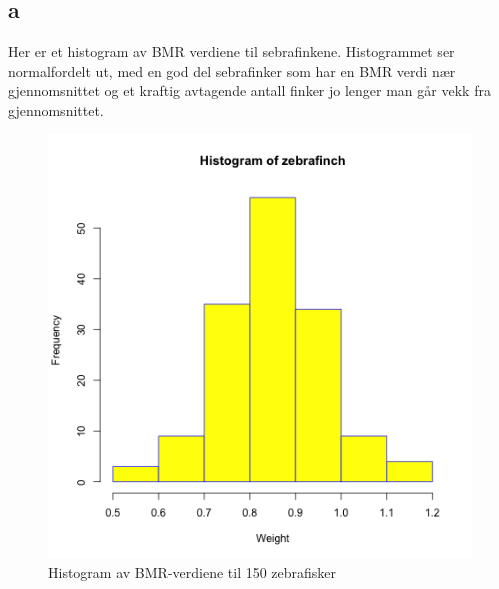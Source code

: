 

\maketitle
\newpage



\section{}%

\subsection*{a}
Her er et histogram av BMR verdiene til sebrafinkene. Histogrammet ser normalfordelt ut, med en god del sebrafinker som har en BMR verdi nær gjennomsnittet og et kraftig avtagende antall finker jo lenger man går vekk fra gjennomsnittet. 
\begin{figure}[H]
        \centering
        \includegraphics[width=0.9\linewidth]{zebrafish.pdf}
        \caption{Histogram av BMR-verdiene til 150 zebrafisker}
        \label{fig:histogram}
\end{figure}


